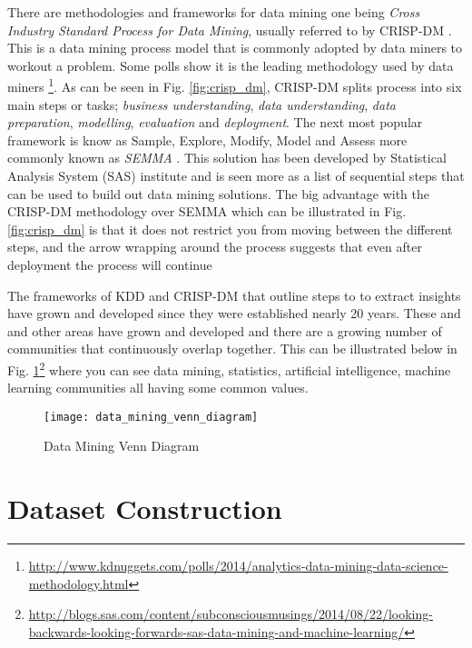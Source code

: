 There are methodologies and frameworks for data mining one being \textit{Cross Industry Standard Process for Data Mining}, usually referred to by CRISP-DM \citep{shearer_crisp-dm_2000}. This is a data mining process model that is commonly adopted by data miners to workout a problem. Some polls show it is the leading methodology used by data miners \footnote{\url{http://www.kdnuggets.com/polls/2014/analytics-data-mining-data-science-methodology.html}}. As can be seen in Fig. \ref{fig:crisp_dm}, CRISP-DM splits process into six main steps or tasks; \textit{business understanding}, \textit{data understanding}, \textit{data preparation}, \textit{modelling}, \textit{evaluation} and \textit{deployment}. The next most popular framework is know as Sample, Explore, Modify, Model and Assess more commonly known as \textit{SEMMA} \citep{azevedo_kdd_2008}. This solution has been developed by Statistical Analysis System (SAS) institute and is seen more as a list of sequential steps that can be used to build out data mining solutions. The big advantage with the CRISP-DM methodology over SEMMA which can be illustrated in Fig. \ref{fig:crisp_dm} is that it does not restrict you from moving between the different steps, and the arrow wrapping around the process suggests that even after deployment the process will continue  


The frameworks of KDD and CRISP-DM that outline steps to to extract insights have grown and developed since they were established nearly 20 years. These and and other areas have grown and developed and there are a growing number of communities that continuously overlap together. This can be illustrated below in Fig. \ref{fig:data_mining_venn_diagram}\footnote{\url{http://blogs.sas.com/content/subconsciousmusings/2014/08/22/looking-backwards-looking-forwards-sas-data-mining-and-machine-learning/}} where you can see data mining, statistics, artificial intelligence, machine learning communities all having some common values.  

\begin{figure}[H]
	\texttt{[image: data\_mining\_venn\_diagram]}
	\caption{Data Mining Venn Diagram
	}
	\label{fig:data_mining_venn_diagram}
\end{figure}



\section{Dataset Construction}

